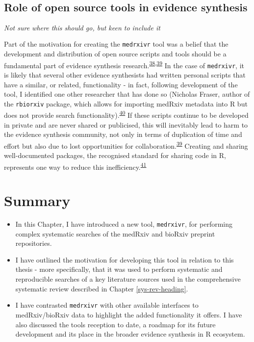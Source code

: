\documentclass[a4paper, twoside]{templates/ociamthesis}
\begin{document}
~

\hypertarget{role-of-open-source-tools-in-evidence-synthesis}{%
\subsection{Role of open source tools in evidence synthesis}\label{role-of-open-source-tools-in-evidence-synthesis}}

\emph{Not sure where this should go, but keen to include it}

Part of the motivation for creating the \texttt{medrxivr} tool was a belief that the development and distribution of open source scripts and tools should be a fundamental part of evidence synthesis research.\textsuperscript{\protect\hyperlink{ref-goldacre2019b}{38},\protect\hyperlink{ref-mckiernan2016c}{39}} In the case of \texttt{medrxivr}, it is likely that several other evidence synthesists had written personal scripts that have a similar, or related, functionality - in fact, following development of the tool, I identified one other researcher that has done so (Nicholas Fraser, author of the \texttt{rbiorxiv} package, which allows for importing medRxiv metadata into R but does not provide search functionality).\textsuperscript{\protect\hyperlink{ref-rbiorxiv}{40}} If these scripts continue to be developed in private and are never shared or publicised, this will inevitably lead to harm to the evidence synthesis community, not only in terms of duplication of time and effort but also due to lost opportunities for collaboration.\textsuperscript{\protect\hyperlink{ref-mckiernan2016c}{39}} Creating and sharing well-documented packages, the recognised standard for sharing code in R, represents one way to reduce this inefficiency.\textsuperscript{\protect\hyperlink{ref-vuorre2020}{41}}

\hypertarget{summary-1}{%
\section{Summary}\label{summary-1}}

\begin{itemize}
\item
  In this Chapter, I have introduced a new tool, \texttt{medrxivr}, for performing complex systematic searches of the medRxiv and bioRxiv preprint repositories.
\item
  I have outlined the motivation for developing this tool in relation to this thesis - more specifically, that it was used to perform systematic and reproducible searches of a key literature sources used in the comprehensive systematic review described in Chapter \ref{sys-rev-heading}.
\item
  I have contrasted \texttt{medrxivr} with other available interfaces to medRxiv/bioRxiv data to highlight the added functionality it offers. I have also discussed the tools reception to date, a roadmap for its future development and its place in the broader evidence synthesis in R ecosystem.
\end{itemize}
\end{document}
